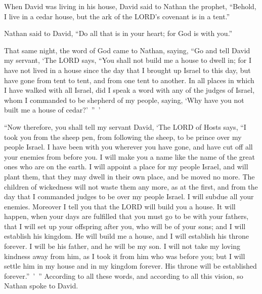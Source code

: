 \mychapter{} \myverse*{}When David was living in his house, David said to Nathan the prophet,
“Behold, I live in a cedar house, but the ark of the LORD’s covenant is in a tent.”

\myverse{}Nathan said to David, “Do all that is in your heart; for God is
with you.”

\myverse{}That same night, the word of God came to Nathan, saying,
\myverse{}“Go and tell David my servant, ‘The LORD says, “You shall not build me a house
to dwell in;
\myverse{}for I have not lived in a house since the day that I brought up Israel to this
day, but have gone from tent to tent, and from one tent to another.
\myverse{}In all places in which I have walked with all Israel, did I speak a word with
any of the judges of Israel, whom I commanded to be shepherd of my people, saying, ‘Why have you not built
me a house of cedar?’ ” ’

\myverse{}“Now therefore, you shall tell my servant David, ‘The LORD of
Hosts says, “I took you from the sheep pen, from following the sheep, to be prince over my people Israel.
\myverse{}I have been with you wherever you have gone, and have cut off all your enemies
from before you. I will make you a name like the name of the great ones who are on the earth.
\myverse{}I will appoint a place for my people Israel, and will plant them, that they
may dwell in their own place, and be moved no more. The children of wickedness will not waste them any
more, as at the first,
\myverse{}and from the day that I commanded judges to be over my people Israel. I will
subdue all your enemies. Moreover I tell you that the LORD will build you a house.
\myverse{}It will happen, when your days are fulfilled that you must go to be with
your fathers, that I will set up your offspring after you, who will be of your sons; and I will establish
his kingdom.
\myverse{}He will build me a house, and I will establish his throne forever.
\myverse{}I will be his father, and he will be my son. I will not take my loving kindness
away from him, as I took it from him who was before you;
\myverse{}but I will settle him in my house and in my kingdom forever. His throne will
be established forever.” ’ ”
\myverse{}According to all these words, and according to all this vision, so Nathan
spoke to David.

